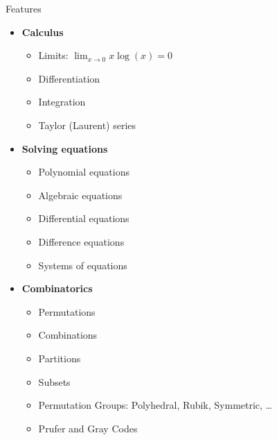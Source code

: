 \documentclass[xcolor=svgnames]{beamer}
\begin{document}
\begin{frame}{Features}
\begin{multicols}{2}
\begin{itemize}
    \item \textbf{Calculus}
      \begin{itemize}
        \tiny
      \item Limits: $\lim_{x\to 0}{x\log(x)} = 0$
      \item Differentiation
      \item Integration
      \item Taylor (Laurent) series
      \end{itemize}
    \item \textbf{Solving equations}
      \begin{itemize}
        \tiny
      \item Polynomial equations
      \item Algebraic equations
      \item Differential equations
      \item Difference equations
      \item Systems of equations
      \end{itemize}
    \item \textbf{Combinatorics}
      \begin{itemize}
        \tiny
      \item Permutations
      \item Combinations
      \item Partitions
      \item Subsets
      \item Permutation Groups: Polyhedral, Rubik, Symmetric, \ldots
      \item Prufer and Gray Codes
      \end{itemize}

    \end{itemize}
  \end{multicols}
\end{frame}
\end{document}
